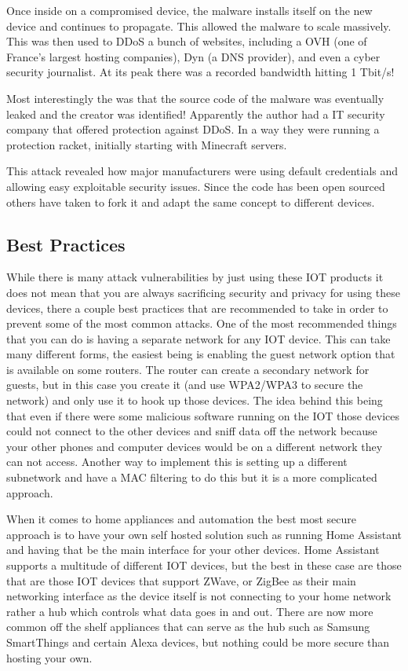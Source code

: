 \documentclass[acmlarge]{style/acmart}
\begin{document}
Once inside on a compromised device, the malware installs itself on the new device and continues to propagate. This allowed the malware to scale massively. This was then used to DDoS a bunch of websites, including a OVH (one of France's largest hosting companies), Dyn (a DNS provider), and even a cyber security journalist. At its peak there was a recorded bandwidth hitting 1 Tbit/s!\cite{Hertzberg_Mirai_2016}

Most interestingly the was that the source code of the malware was eventually leaked and the creator was identified! Apparently the author had a IT security company that offered protection against DDoS. In a way they were running a protection racket, initially starting with Minecraft servers.

This attack revealed how major manufacturers were using default credentials and allowing easy exploitable security issues. Since the code has been open sourced others have taken to fork it and adapt the same concept to different devices.

\subsection{Best Practices}

While there is many attack vulnerabilities by just using these IOT products it does not mean that you are always sacrificing security and privacy for using these devices, there a couple best practices that are recommended to take in order to prevent some of the most common attacks. One of the most recommended things that you can do is having a separate network for any IOT device. This can take many different forms, the easiest being is enabling the guest network option that is available on some routers. The router can create a secondary network for guests, but in this case you create it (and use WPA2/WPA3 to secure the network) and only use it to hook up those devices. The idea behind this being that even if there were some malicious software running on the IOT those devices could not connect to the other devices and sniff data off the network because your other phones and computer devices would be on a different network they can not access. Another way to implement this is setting up a different subnetwork and have a MAC filtering to do this but it is a more complicated approach. 

When it comes to home appliances and automation the best most secure approach is to have your own self hosted solution such as running Home Assistant and having that be the main interface for your other devices. Home Assistant supports a multitude of different IOT devices, but the best in these case are those that are those IOT devices that support ZWave, or ZigBee as their main networking interface as the device itself is not connecting to your home network rather a hub which controls what data goes in and out. There are now more common off the shelf appliances that can serve as the hub such as Samsung SmartThings and certain Alexa devices, but nothing could be more secure than hosting your own.
\end{document}
